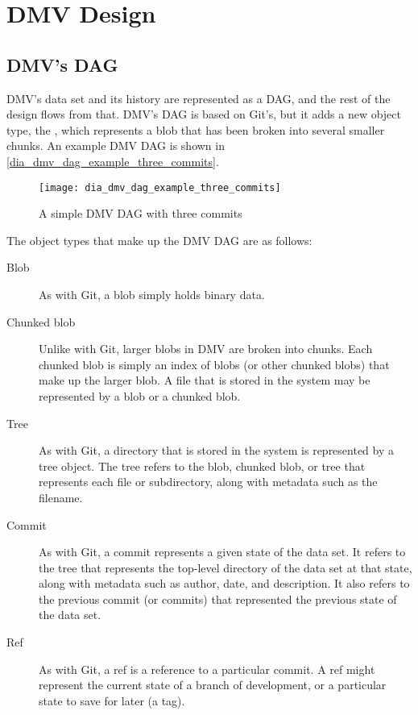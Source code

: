 \chapter{DMV Design}


\section{DMV's DAG}

DMV's data set and its history are represented as a DAG, and the rest of the
design flows from that. DMV's DAG is based on Git's, but it adds a new object
type, the , which represents a blob that has been broken into several smaller chunks. An
example DMV DAG is shown in \autoref{dia_dmv_dag_example_three_commits}.

\begin{figure}[]
    \centering
    \texttt{[image: dia\_dmv\_dag\_example\_three\_commits]}
    \caption{A simple DMV DAG with three commits}
    \label{dia_dmv_dag_example_three_commits}
\end{figure}

The object types that make up the DMV DAG are as follows:

\begin{description}

    \item[Blob] As with Git, a blob simply holds binary data.

    \item[Chunked blob] Unlike with Git, larger blobs in DMV are broken into
        chunks. Each chunked blob is simply an index of blobs (or other chunked
        blobs) that make up the larger blob. A file that is stored in the system
        may be represented by a blob or a chunked blob.

    \item[Tree] As with Git, a directory that is stored in the system is
        represented by a tree object. The tree refers to the blob, chunked blob,
        or tree that represents each file or subdirectory, along with metadata
        such as the filename.

    \item[Commit] As with Git, a commit represents a given state of the data
        set. It refers to the tree that represents the top-level directory of
        the data set at that state, along with metadata such as author, date,
        and description. It also refers to the previous commit (or commits) that
        represented the previous state of the data set.

    \item[Ref] As with Git, a ref is a reference to a particular commit. A ref
        might represent the current state of a branch of development, or a
        particular state to save for later (a tag).

\end{description}

